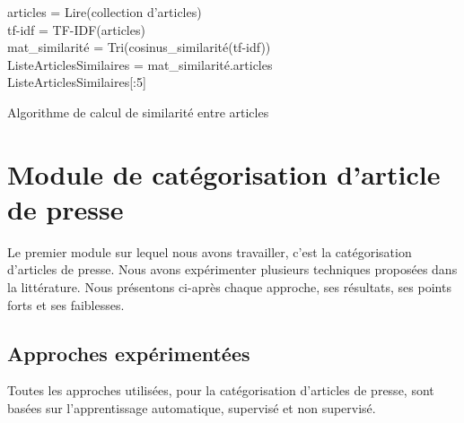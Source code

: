     \begin{algorithm2e}[H]
        \SetAlgoLined
        articles = Lire(collection d'articles)\\
        tf-idf = TF-IDF(articles)\\
        mat\_similarité = Tri(cosinus\_similarité(tf-idf))\\
        ListeArticlesSimilaires = mat\_similarité.articles\\
        \Return ListeArticlesSimilaires[:5]
        \caption{Algorithme de calcul de similarité entre articles}
    \end{algorithm2e}

\section{Module de catégorisation d'article de presse}
Le premier module sur lequel nous avons travailler, c'est la catégorisation d'articles de presse. Nous avons expérimenter plusieurs techniques proposées dans la littérature. Nous présentons ci-après chaque approche, ses résultats, ses points forts et ses faiblesses.


    \subsection{Approches expérimentées\label{approches}}
    Toutes les approches utilisées, pour la catégorisation d'articles de presse, sont basées sur l'apprentissage automatique, supervisé et non supervisé. 


